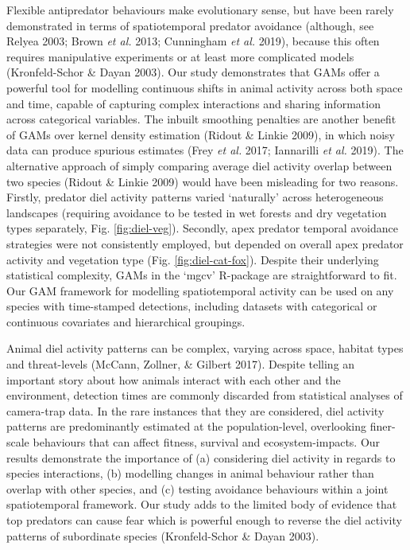 \documentclass[11pt,a4paper,titlepage,twoside,openright]{style/unimelbthesis}
\begin{document}
\begin{mainmatter}
Flexible antipredator behaviours make evolutionary sense, but have been rarely demonstrated in terms of spatiotemporal predator avoidance (although, see Relyea 2003; Brown \emph{et al.} 2013; Cunningham \emph{et al.} 2019), because this often requires manipulative experiments or at least more complicated models (Kronfeld-Schor \& Dayan 2003). Our study demonstrates that GAMs offer a powerful tool for modelling continuous shifts in animal activity across both space and time, capable of capturing complex interactions and sharing information across categorical variables. The inbuilt smoothing penalties are another benefit of GAMs over kernel density estimation (Ridout \& Linkie 2009), in which noisy data can produce spurious estimates (Frey \emph{et al.} 2017; Iannarilli \emph{et al.} 2019). The alternative approach of simply comparing average diel activity overlap between two species (Ridout \& Linkie 2009) would have been misleading for two reasons. Firstly, predator diel activity patterns varied `naturally' across heterogeneous landscapes (requiring avoidance to be tested in wet forests and dry vegetation types separately, Fig. \ref{fig:diel-veg}). Secondly, apex predator temporal avoidance strategies were not consistently employed, but depended on overall apex predator activity and vegetation type (Fig. \ref{fig:diel-cat-fox}). Despite their underlying statistical complexity, GAMs in the `mgcv' R-package are straightforward to fit. Our GAM framework for modelling spatiotemporal activity can be used on any species with time-stamped detections, including datasets with categorical or continuous covariates and hierarchical groupings.

Animal diel activity patterns can be complex, varying across space, habitat types and threat-levels (McCann, Zollner, \& Gilbert 2017). Despite telling an important story about how animals interact with each other and the environment, detection times are commonly discarded from statistical analyses of camera-trap data. In the rare instances that they are considered, diel activity patterns are predominantly estimated at the population-level, overlooking finer-scale behaviours that can affect fitness, survival and ecosystem-impacts. Our results demonstrate the importance of (a) considering diel activity in regards to species interactions, (b) modelling changes in animal behaviour rather than overlap with other species, and (c) testing avoidance behaviours within a joint spatiotemporal framework. Our study adds to the limited body of evidence that top predators can cause fear which is powerful enough to reverse the diel activity patterns of subordinate species (Kronfeld-Schor \& Dayan 2003).


\end{mainmatter}
\end{document}
